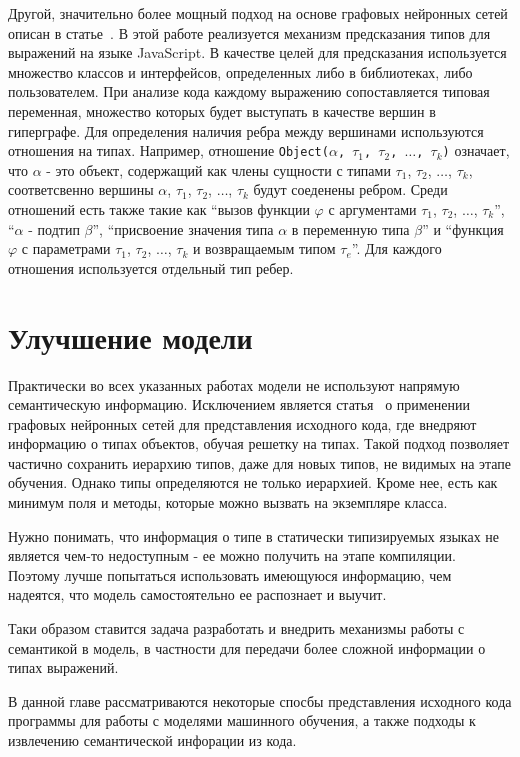 \documentclass[times,specification,annotation]{itmo-student-thesis}
\begin{document}
Другой, значительно более мощный подход на основе графовых нейронных сетей описан в статье~\cite{lambda-net}. В этой работе реализуется механизм предсказания типов для выражений на языке JavaScript. В качестве целей для предсказания используется множество классов и интерфейсов, определенных либо в библиотеках, либо пользователем. При анализе кода каждому выражению сопоставляется типовая переменная, множество которых будет выступать в качестве вершин в гиперграфе. Для определения наличия ребра между вершинами используются отношения на типах. Например, отношение \texttt{Object($\alpha$, $\tau_1$, $\tau_2$, $\ldots$, $\tau_k$)} означает, что $\alpha$ - это объект, содержащий как члены сущности с типами $\tau_1$, $\tau_2$, $\ldots$, $\tau_k$, соответсвенно вершины $\alpha$, $\tau_1$, $\tau_2$, $\ldots$, $\tau_k$ будут соеденены ребром. Среди отношений есть также такие как ``вызов функции $\varphi$ с аргументами $\tau_1$, $\tau_2$, $\ldots$, $\tau_k$'', ``$\alpha$ - подтип $\beta$'', ``присвоение значения типа $\alpha$ в переменную типа $\beta$'' и ``функция $\varphi$ с параметрами $\tau_1$, $\tau_2$, $\ldots$, $\tau_k$ и возвращаемым типом $\tau_e$''. Для каждого отношения используется отдельный тип ребер.


\section{Улучшение модели}\label{sec:improve}
Практически во всех указанных работах модели не используют напрямую семантическую информацию. Исключением является статья~\cite{gated-graphs-nn} о применении графовых нейронных сетей для представления исходного кода, где внедряют информацию о типах объектов, обучая решетку на типах. Такой подход позволяет частично сохранить иерархию типов, даже для новых типов, не видимых на этапе обучения. Однако типы определяются не только иерархией. Кроме нее, есть как минимум поля и методы, которые можно вызвать на экземпляре класса.

Нужно понимать, что информация о типе в статически типизируемых языках не является чем-то недоступным - ее можно получить на этапе компиляции. Поэтому лучше попытаться использовать имеющуюся информацию, чем надеятся, что модель самостоятельно ее распознает и выучит.

Таки образом ставится задача разработать и внедрить механизмы работы с семантикой в модель, в частности для передачи более сложной информации о типах выражений.

\chapterconclusion
В данной главе рассматриваются некоторые спосбы представления исходного кода программы для работы с моделями машинного обучения, а также подходы к извлечению семантической инфорации из кода.
\end{document}
